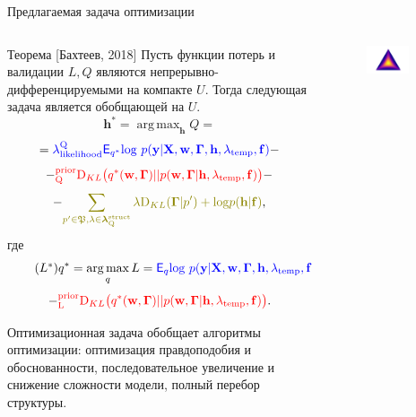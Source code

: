 \documentclass[10pt,pdf,utf8,russian,aspectratio=169]{beamer}
\DeclareMathOperator*{\argmax}{arg\,max}
\begin{document}
\begin{frame}{Предлагаемая задача оптимизации}

\footnotesize
\begin{columns}
\begin{column}{0.8\textwidth}
\begin{block}{Теорема [Бахтеев, 2018]}
Пусть функции потерь и валидации $L,Q$ являются непрерывно-дифференцируемыми на компакте $U$.
Тогда следующая задача является обобщающей на $U$.
\[
\mathbf{h}^{*} = \argmax_{\mathbf{h}} Q = 
\]
\[
= \textcolor{blue}{\lambda_\text{likelihood}^\text{Q}\mathsf{E}_{{q}^{*}} \text{log}~{p(\mathbf{y} | \mathbf{X}, \mathbf{w},\boldsymbol{\Gamma}, \mathbf{h}, \lambda_\text{temp}, \mathbf{f})}}
 -\]
\vspace{-0.3cm}
\[- \textcolor{red}{^\text{prior}_\text{Q}\text{D}_{KL}\bigl( q^{*}(\mathbf{w}, \boldsymbol{\Gamma}) || p(\mathbf{w}, \boldsymbol{\Gamma} |\mathbf{h}, \lambda_{\text{temp}},\mathbf{f}) \bigr)}  -\]
\vspace{-0.3cm}
\[
 - \textcolor{olive}{\sum_{p' \in \mathfrak{P}, \lambda \in \boldsymbol{\lambda}^\text{struct}_\text{Q}} \lambda\text{D}_{KL}(\boldsymbol{\Gamma} | p')+ \text{log}p(\mathbf{h}|\mathbf{f})}, 
\]
где 
\[
\tag{$L^{*}$}
{q}^{*} = \argmax_{q} L = 
\textcolor{blue}{\mathsf{E}_q \text{log}~{p(\mathbf{y} | \mathbf{X}, \mathbf{w}, \boldsymbol{\Gamma}, \mathbf{h}, \lambda_{\text{temp}}, \mathbf{f})}}
\]
\vspace{-0.3cm}
\[- \textcolor{red}{^\text{prior}_\text{L}\text{D}_{KL}\bigl( q^{*}(\mathbf{w}, \boldsymbol{\Gamma}) || p(\mathbf{w}, \boldsymbol{\Gamma} |\mathbf{h}, \lambda_{\text{temp}},\mathbf{f}) \bigr)}.
\]
\end{block}
Оптимизационная задача обобщает алгоритмы оптимизации: оптимизация правдоподобия и обоснованности, последовательное увеличение и снижение сложности модели, полный перебор структуры.
\end{column}
\begin{column}{0.2\textwidth}
\begin{figure}
\centering
\includegraphics[width=0.75\textwidth]{combinations_1.png}

\end{figure}
\end{column}
\end{columns}
\end{frame}
\end{document}

